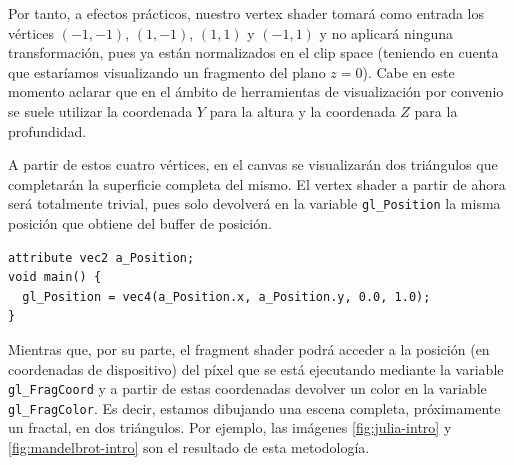 Por tanto, a efectos prácticos, nuestro vertex shader tomará como entrada los vértices $(-1,-1)$, $(1,-1)$, $(1,1)$ y $(-1,1)$ y no aplicará ninguna transformación, pues ya están normalizados en el clip space (teniendo en cuenta que estaríamos visualizando un fragmento del plano $z=0$). Cabe en este momento aclarar que en el ámbito de herramientas de visualización por convenio se suele utilizar la coordenada $Y$ para la altura y la coordenada $Z$ para la profundidad. 

A partir de estos cuatro vértices, en el canvas se visualizarán dos triángulos que completarán la superficie completa del mismo. El vertex shader a partir de ahora será totalmente trivial, pues solo devolverá en la variable \verb|gl_Position| la misma posición que obtiene del buffer de posición.

\begin{lstlisting}
attribute vec2 a_Position;
void main() {
  gl_Position = vec4(a_Position.x, a_Position.y, 0.0, 1.0);
}
\end{lstlisting}

Mientras que, por su parte, el fragment shader podrá acceder a la posición (en coordenadas de dispositivo) del píxel que se está ejecutando mediante la variable \verb|gl_FragCoord| y a partir de estas coordenadas devolver un color en la variable \verb|gl_FragColor|. Es decir, estamos dibujando una escena completa, próximamente un fractal, en dos triángulos. Por ejemplo, las imágenes \ref{fig:julia-intro} y \ref{fig:mandelbrot-intro} son el resultado de esta metodología. 

